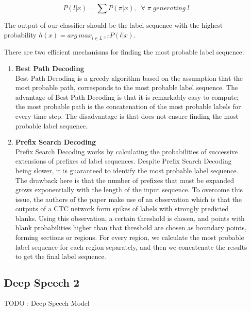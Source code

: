 \begin{equation}
\label{eq:22}
P(l|x) = \sum P(\pi|x), \; \;  \forall \; \pi \; generating \; l
\end{equation}


The output of our classifier should be the label sequence with the highest probability $h(x) = {arg \, max}_{l \in {L^{\leq T}}} P(l|x)$.

There are two efficient mechanisms for finding the most probable label sequence:
\begin{enumerate}
	\item \textbf{Best Path Decoding} \mbox{}\\
	 Best Path Decoding is a greedy algorithm based on the assumption that the most probable path, corresponds to the most probable label sequence. The advantage of Best Path Decoding is that it is remarkably easy to compute; the most probable path is the concatenation of the most probable labels for every time step. The disadvantage is that does not ensure finding the most probable label sequence.
	\item \textbf{Prefix Search Decoding} \mbox{}\\
	Prefix Search Decoding works by calculating the probabilities of successive extensions of prefixes of label sequences. Despite Prefix Search Decoding being slower, it is guaranteed to identify the most probable label sequence. The drawback here is that the number of prefixes that must be expanded grows exponentially with the length of the input sequence. To overcome this issue, the authors of the paper make use of an observation which is that the outputs of a \ac{CTC} network form spikes of labels with strongly predicted blanks. Using this observation, a certain threshold is chosen, and points with blank probabilities higher than that threshold are chosen as boundary points, forming sections or regions. For every region, we calculate the most probable label sequence for each region separately, and then we concatenate the results to get the final label sequence. 
\end{enumerate} 

\subsection{Deep Speech 2} 
\label{bg:sub8}

TODO : Deep Speech Model 



